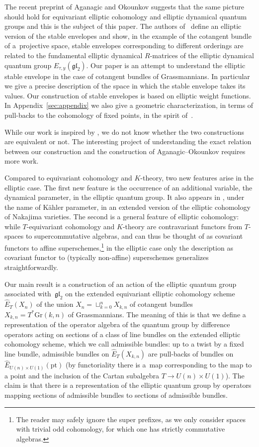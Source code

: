 \documentclass[10pt,a4paper]{amsart}
\numberwithin{equation}{section}
\begin{document}
The recent preprint \cite{AO} of Aganagic and Okounkov suggests that the same picture should hold for equivariant elliptic cohomology and elliptic dynamical quantum groups and this is the subject of this paper. The authors of~\cite{AO} define an elliptic version of the stable envelopes and show, in the example of the cotangent bundle of a~projective space, stable envelopes corresponding to different orderings are related to the fundamental elliptic dynamical $R$-matrices of the elliptic dynamical quantum group $E_{\tau,y}(\mathfrak{gl}_2)$. Our paper is an attempt to understand the elliptic stable envelope in the case of cotangent bundles of Grassmannians. In particular we give a precise description of the space in which the stable envelope takes its values. Our construction of stable envelopes is based on elliptic weight functions. In Appendix~\ref{sec:appendix} we also give a geometric characterization, in terms of pull-backs to the cohomology of fixed points, in the spirit of~\cite{MO}.

While our work is inspired by \cite{AO}, we do not know whether the two constructions are equivalent or not. The interesting project of understanding the exact relation between our construction and the construction of Aganagic--Okounkov requires more work.

Compared to equivariant cohomology and $K$-theory, two new features arise in the elliptic case. The first new feature is the occurrence of an additional variable, the dynamical parameter, in the elliptic quantum group. It also appears in \cite{AO}, under the name of K\"ahler parameter, in an extended version of the elliptic cohomology of Nakajima varieties. The second is a general feature of elliptic cohomology: while $T$-equivariant cohomology and $K$-theory are contravariant functors from $T$-spaces to supercommutative algebras, and can thus be thought of as covariant functors to affine superschemes,\footnote{The reader may safely ignore the super prefixes, as we only consider spaces with trivial odd cohomology, for which one has strictly commutative algebras.} in the elliptic case only the description as covariant functor to (typically non-affine) superschemes generalizes straightforwardly.

Our main result is a construction of an action of the elliptic quantum group associated with~$\mathfrak{gl}_2$ on the extended equivariant elliptic cohomology scheme $\hat E_T(X_{n})$ of the union $X_n=\sqcup_{k=0}^n X_{k,n}$ of cotangent bundles $X_{k,n}=T^*\mathrm{Gr}(k,n)$ of Grassmannians. The meaning of this is that we define a representation of the operator algebra of the quantum group by difference operators acting on sections of a class of line bundles on the extended elliptic cohomology scheme, which we call admissible bundles: up to a twist by a fixed line bundle, admissible bundles on $\hat E_T(X_{k,n})$ are pull-backs of bundles on $\hat E_{U(n)\times U(1)}(\mathrm{pt})$ (by functoriality there is a~map corresponding to the map to a point and the inclusion of the Cartan subalgebra $T\to U(n)\times U(1)$). The claim is that there is a representation of the elliptic quantum group by operators mapping sections of admissible bundles to sections of admissible bundles.
\end{document}

